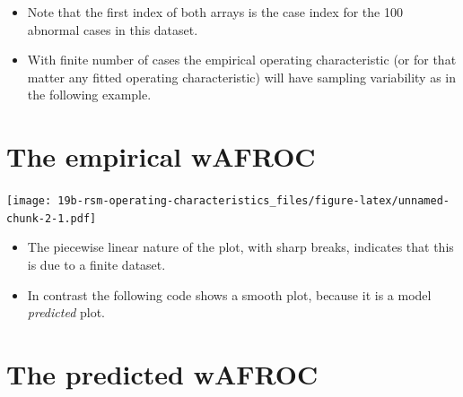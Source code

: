 \documentclass[
]{book}
\newenvironment{Shaded}{\begin{snugshade}}{\end{snugshade}}
\newcommand{\DataTypeTok}[1]{\textcolor[rgb]{0.13,0.29,0.53}{#1}}
\newcommand{\KeywordTok}[1]{\textcolor[rgb]{0.13,0.29,0.53}{\textbf{#1}}}
\newcommand{\NormalTok}[1]{#1}
\newcommand{\OperatorTok}[1]{\textcolor[rgb]{0.81,0.36,0.00}{\textbf{#1}}}
\newcommand{\StringTok}[1]{\textcolor[rgb]{0.31,0.60,0.02}{#1}}
\providecommand{\tightlist}{%
  \setlength{\itemsep}{0pt}\setlength{\parskip}{0pt}}
\begin{document}
\begin{itemize}
\tightlist
\item
  Note that the first index of both arrays is the case index for the 100 abnormal cases in this dataset.
\item
  With finite number of cases the empirical operating characteristic (or for that matter any fitted operating characteristic) will have sampling variability as in the following example.
\end{itemize}

\hypertarget{the-empirical-wafroc}{%
\section{The empirical wAFROC}\label{the-empirical-wafroc}}

\begin{Shaded}
\end{Shaded}

\texttt{[image: 19b-rsm-operating-characteristics\_files/figure-latex/unnamed-chunk-2-1.pdf]}

\begin{itemize}
\tightlist
\item
  The piecewise linear nature of the plot, with sharp breaks, indicates that this is due to a finite dataset.
\item
  In contrast the following code shows a smooth plot, because it is a model \emph{predicted} plot.
\end{itemize}

\hypertarget{the-predicted-wafroc}{%
\section{The predicted wAFROC}\label{the-predicted-wafroc}}
\end{document}
